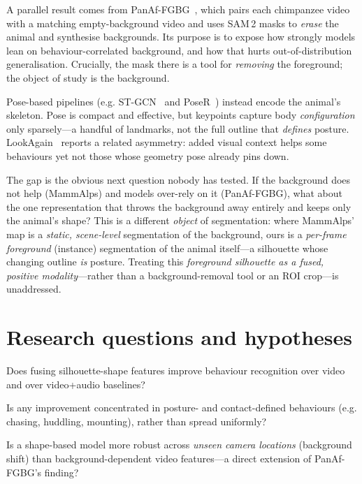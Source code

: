 \documentclass[11pt]{article}
\begin{document}
A parallel result comes from PanAf-FGBG~\cite{panaf}, which pairs each chimpanzee video with a matching empty-background video and uses SAM\,2 masks to \emph{erase} the animal and synthesise backgrounds. Its purpose is to expose how strongly models lean on behaviour-correlated background, and how that hurts out-of-distribution generalisation. Crucially, the mask there is a tool for \emph{removing} the foreground; the object of study is the background.

Pose-based pipelines (e.g. ST-GCN~\cite{stgcn} and PoseR~\cite{poser}) instead encode the animal's skeleton. Pose is compact and effective, but keypoints capture body \emph{configuration} only sparsely---a handful of landmarks, not the full outline that \emph{defines} posture. LookAgain~\cite{lookagain} reports a related asymmetry: added visual context helps some behaviours yet not those whose geometry pose already pins down.

The gap is the obvious next question nobody has tested. If the background does not help (MammAlps) and models over-rely on it (PanAf-FGBG), what about the one representation that throws the background away entirely and keeps only the animal's shape? This is a different \emph{object} of segmentation: where MammAlps' map is a \emph{static, scene-level} segmentation of the background, ours is a \emph{per-frame foreground} (instance) segmentation of the animal itself---a silhouette whose changing outline \emph{is} posture. Treating this \emph{foreground silhouette as a fused, positive modality}---rather than a background-removal tool or an ROI crop---is unaddressed.

\section{Research questions and hypotheses}
\begin{description}[leftmargin=2.2em,style=nextline]
  \item[RQ1 (does it help?)] Does fusing silhouette-shape features improve behaviour recognition over video and over video+audio baselines?
  \item[RQ2 (where?)] Is any improvement concentrated in posture- and contact-defined behaviours (e.g. chasing, huddling, mounting), rather than spread uniformly?
  \item[RQ3 (robustness)] Is a shape-based model more robust across \emph{unseen camera locations} (background shift) than background-dependent video features---a direct extension of PanAf-FGBG's finding?
\end{description}
\end{document}
